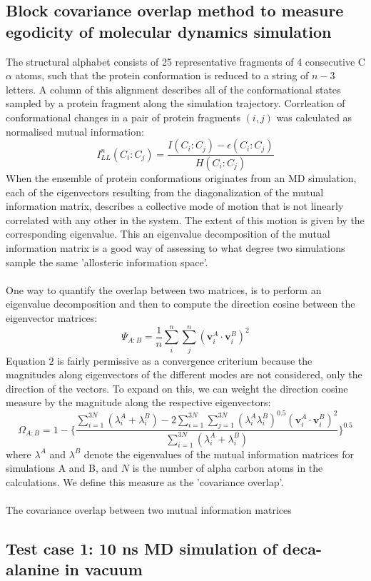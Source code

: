 \documentclass[11pt]{article}
\begin{document}
\subsection*{Block covariance overlap method to measure egodicity of molecular dynamics simulation} 
The structural alphabet consists of 25 representative fragments of 4 consecutive C$\alpha$ atoms, such that the protein conformation is reduced to a string of $n-3$ letters. A column of this alignment describes all of the conformational states sampled by a protein fragment along the simulation trajectory. Corrleation of conformational changes in a pair of protein fragments $(i, j)$ was calculated as normalised mutual information:
\begin{equation}
I_{LL}^{n} (C_{i}:C_{j}) = \frac{I(C_{i}:C_{j}) - \epsilon (C_{i}:C_{j})}{H(C_{i}:C_{j})}
\end{equation}
When the ensemble of protein conformations originates from an MD simulation, each of the eigenvectors resulting from the diagonalization of the mutual information matrix, describes a collective mode of motion that is not linearly correlated with any other in the system. The extent of this motion is given by the corresponding eigenvalue. This an eigenvalue decomposition of the mutual information matrix is a good way of assessing to what degree two simulations sample the same 'allosteric information space'.
\\
\\
One way to quantify the overlap between two matrices, is to perform an eigenvalue decomposition and then to compute the direction cosine between the eigenvector matrices:
\begin{equation}
\Psi_{A:B} = \frac{1}{n} \sum_{i}^{n} \sum_{j}^{n} (\textbf{v}_{i}^{A} \cdot \textbf{v}_{i}^{B})^{2}
\end{equation}
Equation $2$ is fairly permissive as a convergence criterium because the magnitudes along eigenvectors of the different modes are not considered, only the direction of the vectors. To expand on this, we can weight the direction cosine measure by the magnitude along the respective eigenvectors:
\begin{equation}
\Omega_{A:B} = 1 - \lbrace \frac{\sum_{i=1}^{3N}(\lambda_{i}^{A} + \lambda_{i}^{B}) - 2 \sum_{i=1}^{3N} \sum_{j=1}^{3N} (\lambda_{i}^{A} \lambda_{i}^{B})^{0.5} (\textbf{v}_{i}^{A} \cdot \textbf{v}_{i}^{B})^{2}}{\sum_{i=1}^{3N}(\lambda_{i}^{A} + \lambda_{i}^{B})} \rbrace ^{0.5}
\end{equation}
where $\lambda^{A}$ and $\lambda^{B}$ denote the eigenvalues of the mutual information matrices for simulations A and B, and $N$ is the number of alpha carbon atoms in the calculations. We define this measure as the 'covariance overlap'.
\\
\\
The covariance overlap between two mutual information matrices
\subsection*{Test case 1: 10 ns MD simulation of deca-alanine in vacuum}
\end{document}
